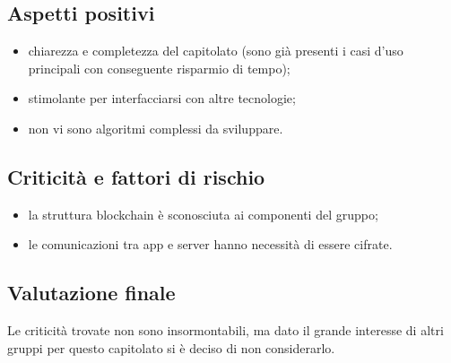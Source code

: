 \subsection{Aspetti positivi}
\begin{itemize}
\item chiarezza e completezza del capitolato (sono già presenti i casi d'uso principali con conseguente risparmio di tempo);
\item stimolante per interfacciarsi con altre tecnologie; 
\item non vi sono algoritmi complessi da sviluppare.
\end{itemize}

\subsection{Criticità e fattori di rischio}
\begin{itemize}
\item la struttura blockchain è sconosciuta ai componenti del gruppo;
\item le comunicazioni tra app e server hanno necessità di essere cifrate.
\end{itemize}

\subsection{Valutazione finale}
Le criticità trovate non sono insormontabili, ma dato il grande interesse di altri gruppi per questo capitolato si è deciso di non considerarlo.
